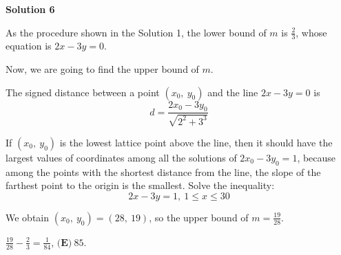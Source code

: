 \begin{enumerate}
 



\textbf{Solution 6}

As the procedure shown in the Solution 1, the lower bound of $m$ is $\frac{2}{3}$, whose equation is $2x - 3y = 0$.

 Now, we are going to find the upper bound of $m$.

 The signed distance between a point $(x_0,\ y_0)$ and the line $2x - 3y = 0$ is 
 \[d = \frac{2x_0 - 3y_0}{\sqrt{2^2 + 3^3}}\]

 If $(x_0,\ y_0)$ is the lowest lattice point above the line, then it should have the largest values of coordinates among all the solutions of $2x_0 - 3y_0 = 1$, because among the points with the shortest distance from the line, the slope of the farthest point to the origin is the smallest. Solve the inequality:
 \[2x - 3y = 1,\ 1 \leq x \leq 30\]

 We obtain $(x_0,\ y_0) = (28,\ 19)$, so the upper bound of $m = \frac{19}{28}$.

 $\frac{19}{28}-\frac{2}{3}=\frac{1}{84}$, $\boxed{\textbf{(E)} ~85}$.

 


\end{enumerate}